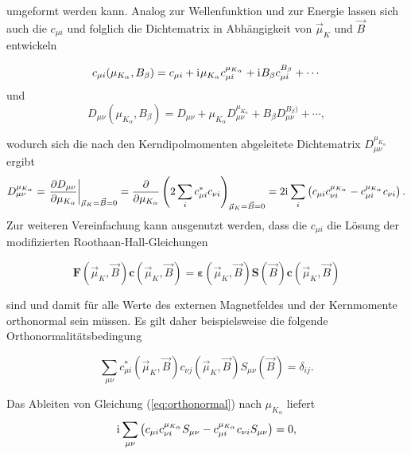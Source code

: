      umgeformt werden kann. Analog zur Wellenfunktion und zur Energie lassen sich auch die $c_{\mu i}$ und folglich die Dichtematrix in Abhängigkeit von $\vec{\mu}_K$ und $\vec{B}$ entwickeln 
     
     \begin{equation}
     c_{\mu i}(\mu_{K_\alpha},B_\beta)=c_{\mu i}+\mathrm{i}\mkern1mu\mu_{K_\alpha}c_{\mu i}^{\mu_{K_\alpha}}+\mathrm{i}\mkern1mu B_\beta c_{\mu i}^{B_\beta}+\cdots
     \end{equation}
     und
     \begin{equation}
     D_{\mu\nu}(\mu_{K_\alpha},B_\beta)=D_{\mu\nu}+\mu_{K_\alpha}D_{\mu\nu}^{\mu_{K_\alpha}}+B_\beta D_{\mu\nu}^{B_\beta)}+\cdots,
     \end{equation}
     
     wodurch sich die nach den Kerndipolmomenten abgeleitete Dichtematrix $D_{\mu\nu}^{\mu_{K_\alpha}}$ ergibt
     \begin{equation}
     D_{\mu\nu}^{\mu_{K_\alpha}}=\left.\frac{\partial D_{\mu\nu}}{\partial \mu_{K_\alpha}}\right\vert_{\vec{\mu}_K=\vec{B}=0}=\frac{\partial}{\partial \mu_{K_\alpha}}\left(2\sum_i c_{\mu i}^*c_{\nu i}\right)_{\vec{\mu}_K=\vec{B}=0}=2\mathrm{i}\mkern1mu \sum_i\left(c_{\mu i}c_{\nu i}^{\mu_{K_\alpha}}-c_{\mu i}^{\mu_{K_\alpha}}c_{\nu i}\right).
     \end{equation}
     Zur weiteren Vereinfachung kann ausgenutzt werden, dass die $c_{\mu i}$ die Lösung der modifizierten Roothaan-Hall-Gleichungen
     
    \begin{equation}\label{eq:modscf}
	  \boldsymbol{F}(\vec{\mu}_K,\vec{B})\boldsymbol{c}(\vec{\mu}_K,\vec{B})=\boldsymbol{\varepsilon}(\vec{\mu}_K,\vec{B})\boldsymbol{S}(\vec{B})\boldsymbol{c}(\vec{\mu}_K,\vec{B})
	\end{equation}
	 
	sind und damit für alle Werte des externen Magnetfeldes und der Kernmomente orthonormal sein müssen. Es gilt daher beispielsweise die folgende Orthonormalitätsbedingung
	
	\begin{equation}\label{eq:orthonormal}
	\sum_{\mu\nu}c_{\mu i}^*(\vec{\mu}_K,\vec{B})c_{\nu j}(\vec{\mu}_K,\vec{B})S_{\mu\nu}(\vec{B})=\delta_{ij}.
	\end{equation}
	
	Das Ableiten von Gleichung (\ref{eq:orthonormal}) nach $\mu_{K_\alpha}$ liefert
	\begin{equation}
	\mathrm{i}\mkern1mu\sum_{\mu\nu}\left(c_{\mu i}c_{\nu i}^{\mu_{K_\alpha}}S_{\mu\nu}-c_{\mu i}^{\mu_{K_\alpha}}c_{\nu i}S_{\mu\nu}\right)=0,
	\end{equation}
	
